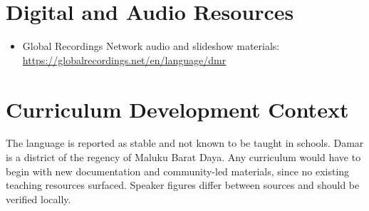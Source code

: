 \documentclass[12pt]{article}
\begin{document}
\section{Digital and Audio Resources}
\begin{itemize}
\item Global Recordings Network audio and slideshow materials: \url{https://globalrecordings.net/en/language/dmr}
\end{itemize}

\section{Curriculum Development Context}
The language is reported as stable and not known to be taught in schools. Damar is a district of the regency of Maluku Barat Daya. Any curriculum would have to begin with new documentation and community-led materials, since no existing teaching resources surfaced. Speaker figures differ between sources and should be verified locally.
\end{document}
